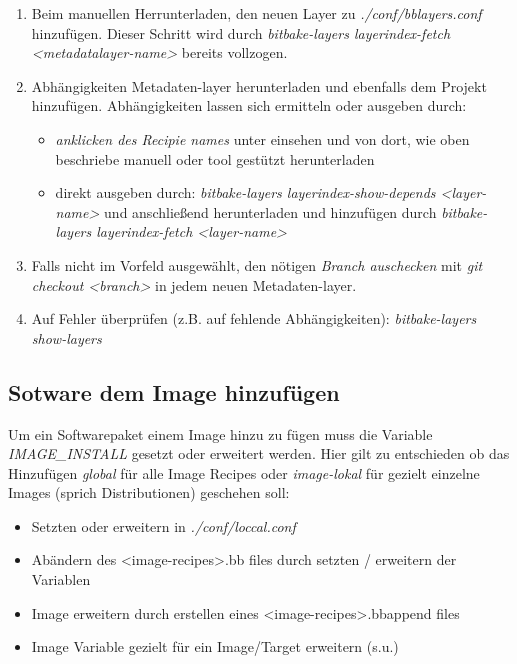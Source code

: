 \begin{enumerate}
    \item Beim manuellen Herrunterladen, den neuen Layer zu
        \textit{./conf/bblayers.conf} hinzufügen. Dieser
        Schritt wird durch \textit{bitbake-layers layerindex-fetch
            <metadatalayer-name>} bereits vollzogen.
    \item Abhängigkeiten Metadaten-layer herunterladen und ebenfalls dem Projekt
        hinzufügen. Abhängigkeiten lassen sich ermitteln oder ausgeben durch:
        \begin{itemize}
            \item \textit{anklicken des Recipie
                    names} unter \cite{OpenEmbedded:Indexer_Recipes} einsehen
                    und von dort, wie oben beschriebe manuell oder tool gestützt
                    herunterladen
            \item direkt ausgeben durch:
                \textit{bitbake-layers layerindex-show-depends <layer-name>}
                und anschließend herunterladen und hinzufügen durch \newline
                \textit{bitbake-layers layerindex-fetch <layer-name>}
        \end{itemize}
    \item Falls nicht im Vorfeld ausgewählt, den nötigen
        \textit{Branch auschecken} mit \textit{git checkout <branch>} in jedem
        neuen Metadaten-layer.
    \item Auf Fehler überprüfen (z.B. auf fehlende Abhängigkeiten): \newline
        \textit{bitbake-layers show-layers}
\end{enumerate}

\subsection{Sotware dem Image hinzufügen}%
\label{sub:sotware_dem_image_hinzufugen_}
Um ein Softwarepaket einem Image hinzu zu fügen muss die Variable
\textit{IMAGE\_INSTALL} gesetzt oder erweitert werden. Hier gilt zu entschieden
ob das Hinzufügen \textit{global} für alle Image Recipes oder \textit{image-lokal}
für gezielt einzelne Images (sprich Distributionen) geschehen soll:
\begin{itemize}
    \item Setzten oder erweitern in \textit{./conf/loccal.conf}
    \item Abändern des <image-recipes>.bb files durch setzten / erweitern der
        Variablen
    \item Image erweitern durch erstellen eines <image-recipes>.bbappend files
    \item Image Variable gezielt für ein Image/Target erweitern (s.u.)
\end{itemize}

